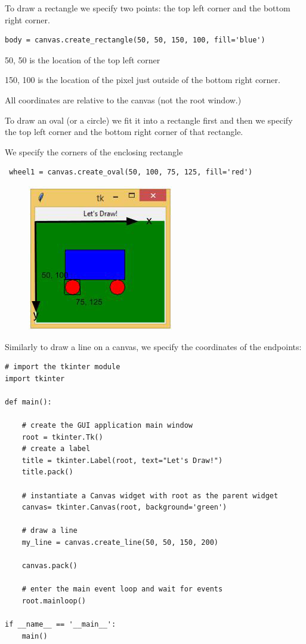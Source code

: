 \documentclass{article}
\begin{document}
To draw a rectangle we specify two points:  the top left corner and the bottom right corner.

 
\begin{lstlisting}
body = canvas.create_rectangle(50, 50, 150, 100, fill='blue')
\end{lstlisting}

50, 50 is the location of the top left corner 

150, 100 is the location of the pixel just outside of the bottom right corner.

All coordinates are relative to the canvas (not the root window.)

To draw an oval (or a circle) we fit it into a rectangle first and then we specify the top left corner and the bottom right corner of that rectangle.

We specify the corners of the enclosing rectangle

\begin{lstlisting}
 wheel1 = canvas.create_oval(50, 100, 75, 125, fill='red')
\end{lstlisting}

\begin{figure}[h]
\includegraphics[scale=.6]{circlecoord}\\
\end{figure}

Similarly to draw a line on a canvas, we specify the coordinates of the endpoints:

\begin{lstlisting}
# import the tkinter module
import tkinter
 
def main():
 
    # create the GUI application main window
    root = tkinter.Tk()
    # create a label
    title = tkinter.Label(root, text="Let's Draw!")
    title.pack()
 
    # instantiate a Canvas widget with root as the parent widget
    canvas= tkinter.Canvas(root, background='green')
 
    # draw a line
    my_line = canvas.create_line(50, 50, 150, 200)
 
    canvas.pack()
 
    # enter the main event loop and wait for events
    root.mainloop()
 
if __name__ == '__main__':
    main()
\end{lstlisting}
\end{document}
